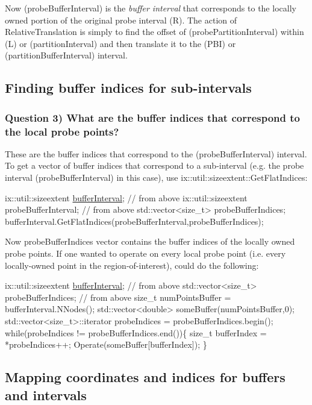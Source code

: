 Now (probe\+Buffer\+Interval) is the {\itshape buffer interval} that corresponds to the locally owned portion of the original probe interval (R). The action of Relative\+Translation is simply to find the offset of (probe\+Partition\+Interval) within (L) or (partition\+Interval) and then translate it to the (P\+BI) or (partition\+Buffer\+Interval) interval.

\hypertarget{developer_reference_indices}{}\subsection{Finding buffer indices for sub-\/intervals}\label{developer_reference_indices}
\subsubsection*{Question 3) What are the buffer indices that correspond to the local probe points?}

These are the buffer indices that correspond to the (probe\+Buffer\+Interval) interval. To get a vector of buffer indices that correspond to a sub-\/interval (e.\+g. the probe interval (probe\+Buffer\+Interval) in this case), use ix\+::util\+::sizeextent\+::\+Get\+Flat\+Indices\+:


\begin{DoxyCode}
ix::util::sizeextent \hyperlink{SATKernels_8H_a4caa6f5ca62531b8c31e22919f206d68}{bufferInterval};      \textcolor{comment}{// from above}
ix::util::sizeextent probeBufferInterval; \textcolor{comment}{// from above}
std::vector<size\_t> probeBufferIndices;
bufferInterval.GetFlatIndices(probeBufferInterval,probeBufferIndices);
\end{DoxyCode}


Now probe\+Buffer\+Indices vector contains the buffer indices of the locally owned probe points. If one wanted to operate on every local probe point (i.\+e. every locally-\/owned point in the region-\/of-\/interest), could do the following\+:


\begin{DoxyCode}
ix::util::sizeextent \hyperlink{SATKernels_8H_a4caa6f5ca62531b8c31e22919f206d68}{bufferInterval};    \textcolor{comment}{// from above}
std::vector<size\_t> probeBufferIndices; \textcolor{comment}{// from above}
\textcolor{keywordtype}{size\_t} numPointsBuffer = bufferInterval.NNodes();
std::vector<double> someBuffer(numPointsBuffer,0);
std::vector<size\_t>::iterator probeIndices = probeBufferIndices.begin();
\textcolor{keywordflow}{while}(probeIndices != probeBufferIndices.end())\{                
  \textcolor{keywordtype}{size\_t} bufferIndex = *probeIndices++;                         
  Operate(someBuffer[bufferIndex]);                             
\}                                                                       
\end{DoxyCode}
\hypertarget{developer_reference_mapping}{}\subsection{Mapping coordinates and indices for buffers and intervals}\label{developer_reference_mapping}

